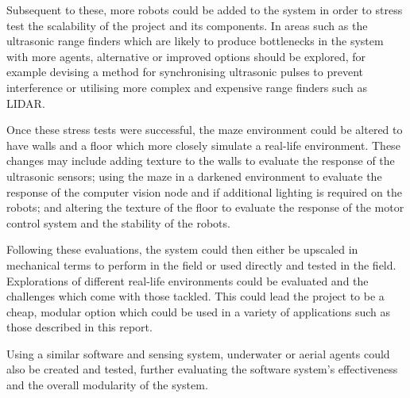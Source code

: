 Subsequent to these, more robots could be added to the system in order to 
stress test the scalability of the project and its components. In areas such as
the ultrasonic range finders which are likely to produce bottlenecks in the system
with more agents, alternative or improved options should be explored, for example
devising a method for synchronising ultrasonic pulses to prevent interference or
utilising more complex and expensive range finders such as LIDAR. 

Once these stress tests were successful, the maze environment could be altered to
have walls and a floor which more closely simulate a real-life environment. These
changes may include adding texture to the walls to evaluate the response of the
ultrasonic sensors; using the maze in a darkened environment to evaluate the
response of the computer vision node and if additional lighting is required on the
robots; and altering the texture of the floor to evaluate the response of the
motor control system and the stability of the robots. 

Following these evaluations, the system could then either be upscaled in 
mechanical terms to perform in the field or used directly and tested in the 
field. Explorations of different real-life environments could be evaluated 
and the challenges which come with those tackled. This could lead the 
project to be a cheap, modular option which could be used in a variety of 
applications such as those described in this report. 

Using a similar software and sensing system, underwater or aerial agents 
could also be created and tested, further evaluating the software system's 
effectiveness and the overall modularity of the system. 